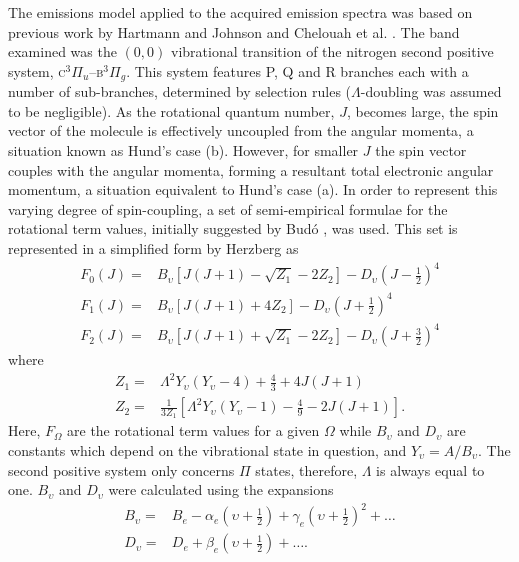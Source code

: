 The emissions model applied to the acquired emission spectra was based on
previous work by Hartmann and Johnson \cite{Hartmann1978} and Chelouah et al.
\cite{Chelouah1994}. The band examined was the $(0,0)$ vibrational transition of
the nitrogen second positive system, \textsc{c}$^3\Pi_u$--\textsc{b}$^3\Pi_g$.
This system features P, Q and R branches each with a number of sub-branches,
determined by selection rules ($\Lambda$-doubling was assumed to be negligible).
As the rotational quantum number, $J$, becomes large, the spin vector of the
molecule is effectively uncoupled from the angular momenta, a situation known as
Hund's case (b). However, for smaller $J$ the spin vector couples with the
angular momenta, forming a resultant total electronic angular momentum, a
situation equivalent to Hund's case (a). In order to represent this varying
degree of spin-coupling, a set of semi-empirical formulae for the rotational
term values, initially suggested by Bud\'{o} \cite{budo1935}, was used. This set
is represented in a simplified form by Herzberg \cite{Herzberg1950} as
\begin{align}
  F_0(J) = & B_\upsilon \left[J(J + 1) - \sqrt{Z_1} - 2Z_2\right]
             - D_\upsilon \left(J - \frac{1}{2}\right)^4 \\
  F_1(J) = & B_\upsilon \left[J(J + 1) + 4Z_2\right]
             - D_\upsilon \left(J + \frac{1}{2}\right)^4 \\
  F_2(J) = & B_\upsilon \left[J(J + 1) + \sqrt{Z_1} - 2Z_2\right]
             - D_\upsilon \left(J + \frac{3}{2}\right)^4
\end{align}
where
\begin{align}
  Z_1 = & \Lambda^2 Y_\upsilon(Y_\upsilon - 4)
      + \frac{4}{3} + 4J(J + 1) \\
  Z_2 = & \frac{1}{3Z_1} \left[ \Lambda^2 Y_\upsilon(Y_\upsilon - 1)
      - \frac{4}{9} - 2J(J + 1) \right].
\end{align}
Here, $F_\Omega$ are the rotational term values for a given $\Omega$ while
$B_\upsilon$ and $D_\upsilon$ are constants which depend on the vibrational
state in question, and $Y_\upsilon=A/B_\upsilon$. The second positive system
only concerns $\Pi$ states, therefore, $\Lambda$ is always equal to one.
$B_\upsilon$ and $D_\upsilon$ were calculated using the expansions
\begin{align}
  B_\upsilon = & B_e - \alpha_e\left(\upsilon + \frac{1}{2}\right)
                 + \gamma_e\left(\upsilon + \frac{1}{2}\right)^2 + \ldots \\
  D_\upsilon = & D_e + \beta_e \left(\upsilon + \frac{1}{2}\right) + \ldots.
\end{align}
